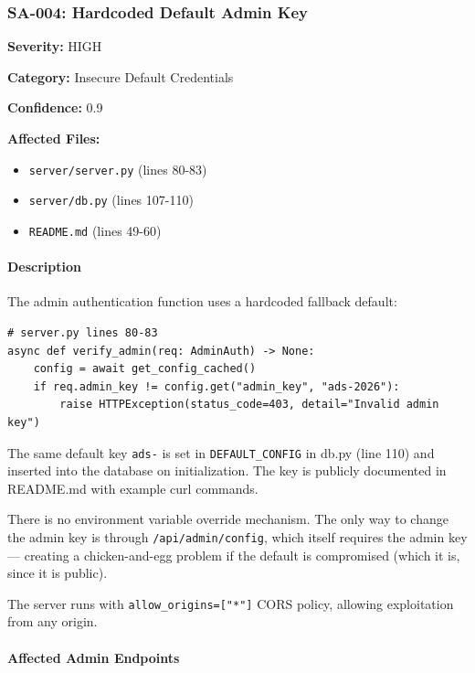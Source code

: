 \documentclass[twocolumn,10pt,letterpaper]{article}
\begin{document}
\subsubsection{SA-004: Hardcoded Default Admin Key}

\textbf{Severity:} HIGH  

\textbf{Category:} Insecure Default Credentials  

\textbf{Confidence:} 0.9  

\textbf{Affected Files:}  


\begin{itemize}
\setlength{\itemsep}{0pt}
\setlength{\parskip}{0pt}
  \item \texttt{server/\allowbreak server.py} (lines 80-83)
  \item \texttt{server/\allowbreak db.py} (lines 107-110)
  \item \texttt{README.md} (lines 49-60)
\end{itemize}

\paragraph{Description}

The admin authentication function uses a hardcoded fallback default:


\begin{lstlisting}
# server.py lines 80-83
async def verify_admin(req: AdminAuth) -> None:
    config = await get_config_cached()
    if req.admin_key != config.get("admin_key", "ads-2026"):
        raise HTTPException(status_code=403, detail="Invalid admin key")
\end{lstlisting}

The same default key \texttt{ads-} is set in \texttt{DEFAULT\_CONFIG} in db.py (line 110) and inserted into the database on initialization. The key is publicly documented in README.md with example curl commands.


There is no environment variable override mechanism. The only way to change the admin key is through \texttt{/\allowbreak api/\allowbreak admin/\allowbreak config}, which itself requires the admin key — creating a chicken-and-egg problem if the default is compromised (which it is, since it is public).


The server runs with \texttt{allow\_origins=["*"]} CORS policy, allowing exploitation from any origin.


\paragraph{Affected Admin Endpoints}
\end{document}
